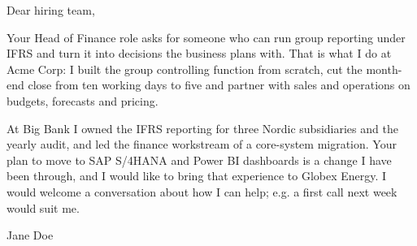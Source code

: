 \documentclass{letter}
\begin{document}
Dear hiring team,

Your Head of Finance role asks for someone who can run group reporting under IFRS and turn it
into decisions the business plans with. That is what I do at Acme Corp: I built the group
controlling function from scratch, cut the month-end close from ten working days to five and
partner with sales and operations on budgets, forecasts and pricing.

At Big Bank I owned the IFRS reporting for three Nordic subsidiaries and the yearly audit, and
led the finance workstream of a core-system migration. Your plan to move to SAP S/4HANA and
Power BI dashboards is a change I have been through, and I would like to bring that experience
to Globex Energy. I would welcome a conversation about how I can help; e.g. a first call
next week would suit me.
\closing{Jane Doe}
\end{document}
